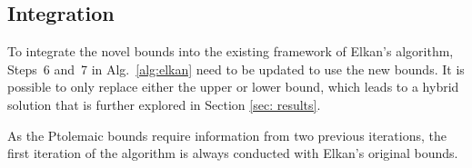 \subsection{Integration}
To integrate the novel bounds into the existing framework of Elkan's algorithm,
 Steps~6 and~7 in Alg.~\autoref{alg:elkan} need to be updated to use the new bounds.
It is possible to only replace either the upper or lower bound, which leads to a hybrid solution that is further explored in Section \ref{sec: results}.

As the Ptolemaic bounds require information from two previous iterations, the first iteration of the algorithm is always conducted with Elkan's original bounds.






